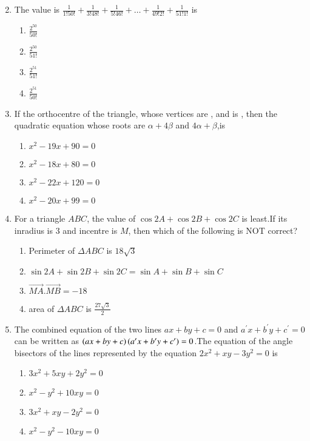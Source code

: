 \documentclass[journal]{IEEEtran}
\begin{document}
\begin{enumerate}
\begin{multicols}{2}
\end{multicols}
\item The value is $\frac{1}{1!50!}+\frac{1}{3!48!}+\frac{1}{5!46!}+\dots+\frac{1}{49!2!}+\frac{1}{51!1!}$ is 
\begin{multicols}{2}
\begin{enumerate}
\item $\frac{2^{50}}{50!}$
\item $\frac{2^{50}}{51!}$
\item $\frac{2^{51}}{51!}$
\item $\frac{2^{51}}{50!}$
\end{enumerate}
\end{multicols}
\item If the orthocentre of the triangle, whose vertices are , and  is \brak{\alpha,\beta}, then the quadratic equation whose roots are $\alpha +4\beta$ and $4\alpha +\beta$,is  
\begin{enumerate}
\item $x^2-19x+90=0$
\item $x^2-18x+80=0$
\item $x^2-22x+120=0$
\item $x^2-20x+99=0$
\end{enumerate}
\item For a triangle $ABC$, the value of $\cos{2A}+\cos{2B}+\cos{2C}$ is least.If its inradius is 3 and incentre is $M$, then which of the following is NOT correct? 
\begin{enumerate}
\item Perimeter of $\Delta ABC$ is $18\sqrt{3}$
\item $\sin{2A}+\sin{2B}+\sin{2C}=\sin{A}+\sin{B}+\sin{C}$
\item $\overrightarrow{MA}.\overrightarrow{MB}=-18$
\item area of $\Delta ABC$ is $\frac{27\sqrt{3}}{2}$
\end{enumerate}
\item The combined equation of the two lines $ax+by+c=0$ and $a^\prime x+b^\prime y+c^\prime=0$can be written as $\left(ax+by+c\right)\left(a^\prime x+b^\prime y+c^\prime\right)=0$.The equation of the angle bisectors of the lines represented by the equation $2x^2+xy-3y^2=0$ is 
\begin{enumerate}
\item $3x^2+5xy+2y^2=0$
\item $x^2-y^2+10xy=0$
\item $3x^2+xy-2y^2=0$
\item $x^2-y^2-10xy=0$    

\end{enumerate}
\end{enumerate}
\end{document}
